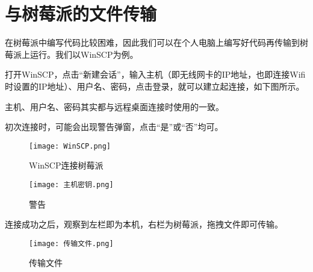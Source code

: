 \section{与树莓派的文件传输}
在树莓派中编写代码比较困难，因此我们可以在个人电脑上编写好代码再传输到树莓派上运行。我们以WinSCP为例。
\par
打开WinSCP，点击“新建会话”，输入主机（即无线网卡的IP地址，也即连接Wifi时设置的IP地址）、用户名、密码，点击登录，就可以建立起连接，如下图所示。
\par 
主机、用户名、密码其实都与远程桌面连接时使用的一致。
\par 
初次连接时，可能会出现警告弹窗，点击“是”或“否”均可。
\begin{figure}[H]
	\centering
	\texttt{[image: WinSCP.png]}
	\caption{WinSCP连接树莓派}
	\label{fig:example}
\end{figure}
\begin{figure}[H]
	\centering
	\texttt{[image: 主机密钥.png]}
	\caption{警告}
	\label{fig:example}
\end{figure}
连接成功之后，观察到左栏即为本机，右栏为树莓派，拖拽文件即可传输。
\begin{figure}[H]
	\centering
	\texttt{[image: 传输文件.png]}
	\caption{传输文件}
	\label{fig:example}
\end{figure}